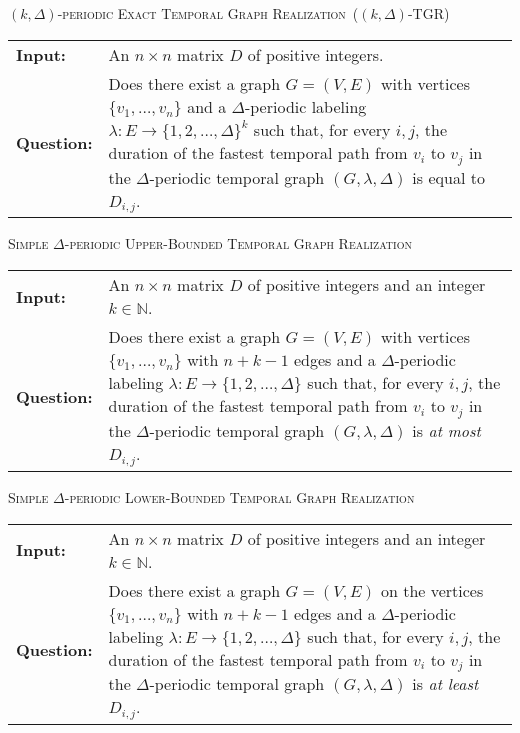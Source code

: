 \documentclass[a4paper,UKenglish,cleveref, autoref, thm-restate]{lipics-v2021}
\makeatletter
\newcommand{\problemdef}[3]{
	\begin{center}
		\begin{minipage}{0.95\textwidth}
			\noindent
			#1
			\vspace{5pt}\\
			\setlength{\tabcolsep}{3pt}
			\begin{tabularx}{\textwidth}{@{}lX@{}}
				\textbf{Input:}& #2 \\
				\textbf{Question:}& #3
			\end{tabularx}
		\end{minipage}
	\end{center}
}
\newcommand{\kDeltaExactLong}{\textsc{$(k,\Delta)$-periodic Exact Temporal Graph Realization}}
\newcommand{\kDeltaExact}{\textsc{$(k,\Delta)$-TGR}}
\newcommand{\DeltaUpperBoundLong}{\textsc{Simple $\Delta$-periodic Upper-Bounded Temporal Graph Realization}}
\newcommand{\kDeltaLowerBoundLong}{\textsc{Simple $\Delta$-periodic Lower-Bounded Temporal Graph Realization}}
\makeatother
\begin{document}
\problemdef{\kDeltaExactLong\ (\kDeltaExact)}
{An $n \times n$ matrix $D$ of positive integers.}
{Does there exist a graph $G=(V,E)$ with vertices $\{v_1,\ldots,v_{n}\}$ 
and a $\Delta$-periodic labeling $\lambda: E \rightarrow \{1,2,\ldots,\Delta\}^k$ such that, 
for every $i,j$, the duration of the fastest temporal path from $v_i$ to $v_j$ in the $\Delta$-periodic temporal graph $(G,\lambda,\Delta)$ is equal to $D_{i,j}$.}

\problemdef{\DeltaUpperBoundLong}
{An $n \times n$ matrix $D$ of positive integers and an integer $k\in \mathbb{N}$.}
{Does there exist a graph $G=(V,E)$ with vertices $\{v_1,\ldots,v_{n}\}$ with $n+k-1$ edges 
	and a $\Delta$-periodic labeling $\lambda: E \rightarrow \{1,2,\ldots,\Delta\}$ such that, 
	for every $i,j$, the duration of the fastest temporal path from $v_i$ to $v_j$ in the $\Delta$-periodic temporal graph $(G,\lambda,\Delta)$ is \emph{at most} $D_{i,j}$.}

\problemdef{\kDeltaLowerBoundLong}
{An $n \times n$ matrix $D$ of positive integers and an integer $k\in \mathbb{N}$.}
{Does there exist a graph $G=(V,E)$ on the vertices $\{v_1,\ldots,v_{n}\}$ with $n+k-1$ edges 
and a $\Delta$-periodic labeling $\lambda: E \rightarrow \{1,2,\ldots,\Delta\}$ such that, 
for every $i,j$, the duration of the fastest temporal path from $v_i$ to $v_j$ in the $\Delta$-periodic temporal graph $(G,\lambda,\Delta)$ is \emph{at least} $D_{i,j}$.}


\clearpage
\end{document}
